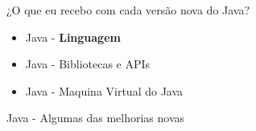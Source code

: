 \documentclass[aspectratio=169]{beamer}
\begin{document}

\begin{frame}[fragile]{¿O que eu recebo com cada versão nova do Java?}
	\begin{itemize}
		\item Java - \textbf{Linguagem}
		\item Java - Bibliotecas e APIs
		\item Java - Maquina Virtual do Java
	\end{itemize}	
\end{frame}



\begin{frame}[fragile]{Java - Algumas das melhorias novas}
	\begin{columns}[T] %
		

\end{columns}
\end{frame}
\end{document}
